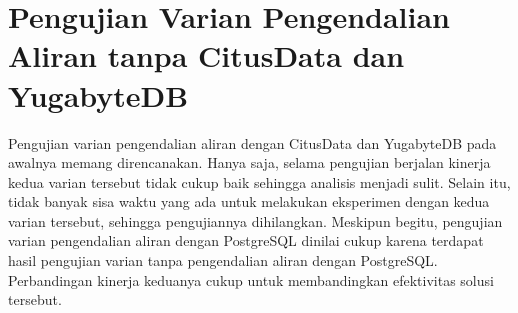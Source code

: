 \section{Pengujian Varian Pengendalian Aliran tanpa CitusData dan YugabyteDB}

Pengujian varian pengendalian aliran dengan CitusData dan YugabyteDB pada awalnya memang direncanakan. Hanya saja, selama pengujian berjalan kinerja kedua varian tersebut tidak cukup baik sehingga analisis menjadi sulit. Selain itu, tidak banyak sisa waktu yang ada untuk melakukan eksperimen dengan kedua varian tersebut, sehingga pengujiannya dihilangkan. Meskipun begitu, pengujian varian pengendalian aliran dengan PostgreSQL dinilai cukup karena terdapat hasil pengujian varian tanpa pengendalian aliran dengan PostgreSQL. Perbandingan kinerja keduanya cukup untuk membandingkan efektivitas solusi tersebut.
